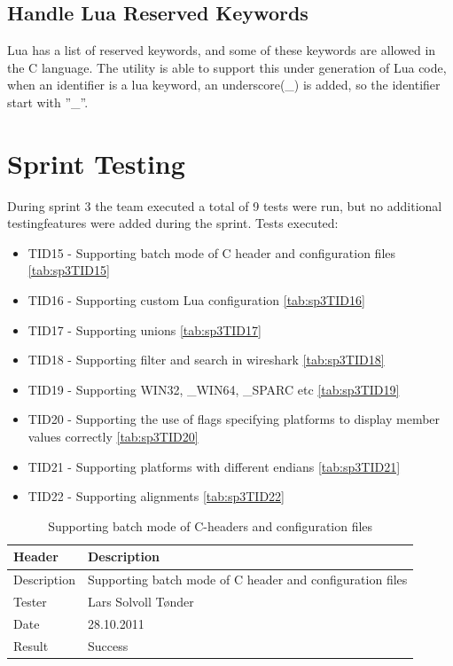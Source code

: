 \subsection{Handle Lua Reserved Keywords}
Lua has a list of reserved keywords, and some of these keywords are allowed in 
the C language. The utility is able to support this under generation of Lua 
code, when an identifier is a lua keyword, an underscore(\_) is added, so the 
identifier start with ''\_''.

\section{Sprint Testing}
During sprint 3 the team executed a total of 9 tests were run, but no additional testingfeatures were added during the sprint. Tests executed:

\begin{itemize}
	\item TID15 - Supporting batch mode of C header and configuration files \autoref{tab:sp3TID15}
	\item TID16 - Supporting custom Lua configuration \autoref{tab:sp3TID16}
	\item TID17 - Supporting unions \autoref{tab:sp3TID17}
	\item TID18 - Supporting filter and search in wireshark \autoref{tab:sp3TID18}
	\item TID19 - Supporting WIN32, \_WIN64, \_SPARC etc \autoref{tab:sp3TID19}
	\item TID20 -  Supporting the use of flags specifying platforms to display member values correctly \autoref{tab:sp3TID20}
	\item TID21 - Supporting platforms with different endians \autoref{tab:sp3TID21}
	\item TID22 - Supporting alignments \autoref{tab:sp3TID22}
\end{itemize}

\begin{table}[!htb] \footnotesize \center
\caption{Supporting batch mode of C-headers and configuration files\label{tab:sp3TID15}}
\begin{tabular}{l l}
	\toprule
	Header & Description \\
	\midrule
	Description & Supporting batch mode of C header and configuration files \\
	Tester & Lars Solvoll Tønder \\
	Date & 28.10.2011 \\
	Result & Success\\
	\bottomrule
\end{tabular}
\end{table}


